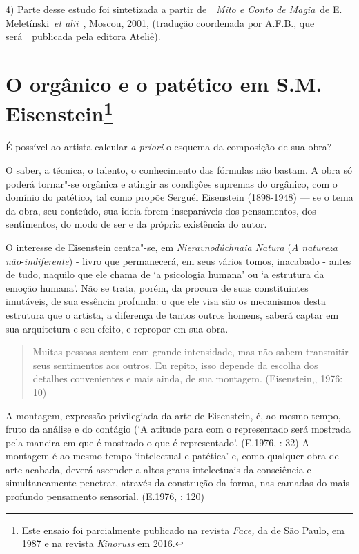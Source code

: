 4) Parte desse estudo foi sintetizada a partir de~~\emph{Mito e Conto de
Magia}~de E. Meletínski~\emph{et alii}~, Moscou, 2001, (tradução
coordenada por A.F.B., que será~~publicada pela editora Ateliê).

\chapter{O orgânico e o patético em S.M. Eisenstein\footnote{Este ensaio
  foi parcialmente publicado na revista \emph{Face,} da  de São Paulo,
  em 1987 e na revista \emph{Kinoruss} em 2016.}}

É possível ao artista calcular \emph{a priori} o esquema da composição
de sua obra?

O saber, a técnica, o talento, o conhecimento das fórmulas não bastam. A
obra só poderá tornar"-se orgânica e atingir as condições supremas do
orgânico, com o domínio do patético, tal como propõe Serguéi Eisenstein
(1898-1948) --- se o tema da obra, seu conteúdo, sua ideia forem
inseparáveis dos pensamentos, dos sentimentos, do modo de ser e da
própria existência do autor.

O interesse de Eisenstein centra"-se, em \emph{Nieravnodúchnaia Natura}
(\emph{A natureza não}-\emph{indiferente}) - livro que permanecerá, em
seus vários tomos, inacabado - antes de tudo, naquilo que ele chama de
`a psicologia humana' ou `a estrutura da emoção humana'. Não se trata,
porém, da procura de suas constituintes imutáveis, de sua essência
profunda: o que ele visa são os mecanismos desta estrutura que o
artista, a diferença de tantos outros homens, saberá captar em sua
arquitetura e seu efeito, e repropor em sua obra.

\begin{quote}
Muitas pessoas sentem com grande intensidade, mas não sabem transmitir
seus sentimentos aos outros. Eu repito, isso depende da escolha dos
detalhes convenientes e mais ainda, de sua montagem. (Eisenstein,,
1976: 10)
\end{quote}

A montagem, expressão privilegiada da arte de Eisenstein, é, ao mesmo
tempo, fruto da análise e do contágio (`A atitude para com o
representado será mostrada pela maneira em que é mostrado o que é
representado'. (E.1976, : 32) A montagem é ao mesmo tempo `intelectual
e patética' e, como qualquer obra de arte acabada, deverá ascender a
altos graus intelectuais da consciência e simultaneamente penetrar,
através da construção da forma, nas camadas do mais profundo pensamento
sensorial. (E.1976, : 120)

